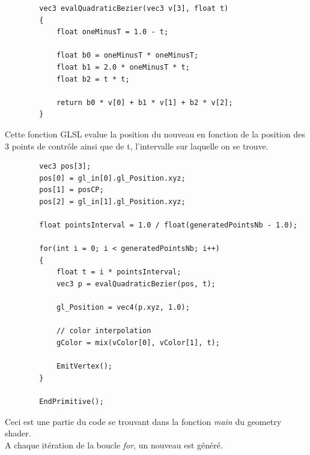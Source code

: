 \documentclass[12pt]{article}
\begin{document}
		\begin{lstlisting}
		vec3 evalQuadraticBezier(vec3 v[3], float t)
		{
		    float oneMinusT = 1.0 - t;

		    float b0 = oneMinusT * oneMinusT;
		    float b1 = 2.0 * oneMinusT * t;
		    float b2 = t * t;
		    
		    return b0 * v[0] + b1 * v[1] + b2 * v[2];
		}
		\end{lstlisting}
		
		Cette fonction GLSL evalue la position du nouveau en fonction de la position des 3
		points de contrôle ainsi que de t, l'intervalle sur laquelle on se trouve.\\
		
		\begin{lstlisting}
		vec3 pos[3];
	    pos[0] = gl_in[0].gl_Position.xyz;
	    pos[1] = posCP;
	    pos[2] = gl_in[1].gl_Position.xyz;
	
	    float pointsInterval = 1.0 / float(generatedPointsNb - 1.0);
	
	    for(int i = 0; i < generatedPointsNb; i++)
	    {
	        float t = i * pointsInterval;
	        vec3 p = evalQuadraticBezier(pos, t);
	
	        gl_Position = vec4(p.xyz, 1.0);
	
	        // color interpolation
	        gColor = mix(vColor[0], vColor[1], t);
	
	        EmitVertex();
	    }
	
	    EndPrimitive();
		\end{lstlisting}
		
		Ceci est une partie du code se trouvant dans la fonction \textit{main} du geometry shader. \\
		A chaque itération de la boucle \textit{for}, un nouveau est généré.\\
		
		\clearpage
	
\end{document}
